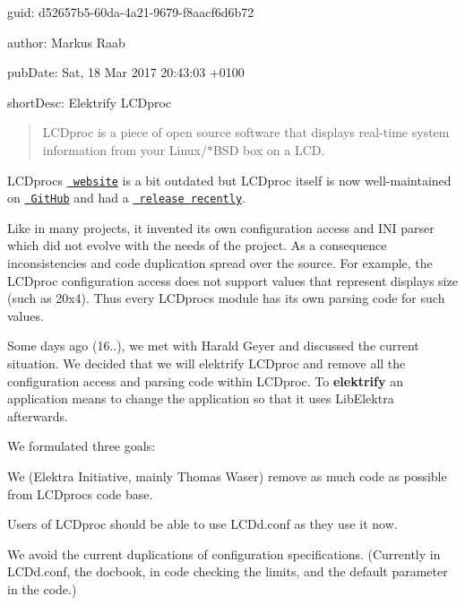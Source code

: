 
\begin{DoxyItemize}
\item guid\+: d52657b5-\/60da-\/4a21-\/9679-\/f8aacf6d6b72
\item author\+: Markus Raab
\item pub\+Date\+: Sat, 18 Mar 2017 20\+:43\+:03 +0100
\item short\+Desc\+: Elektrify L\+C\+Dproc
\end{DoxyItemize}

\begin{quote}
L\+C\+Dproc is a piece of open source software that displays real-\/time system information from your {\ttfamily Linux}/{\ttfamily $\ast$\+B\+SD} box on a L\+CD. \end{quote}


L\+C\+Dproc\textquotesingle{}s \href{http://lcdproc.omnipotent.net/}{\texttt{ website}} is a bit outdated but L\+C\+Dproc itself is now well-\/maintained on \href{https://github.com/lcdproc/lcdproc}{\texttt{ Git\+Hub}} and had a \href{https://github.com/lcdproc/lcdproc/releases}{\texttt{ release recently}}.

Like in many projects, it invented its own configuration access and I\+NI parser which did not evolve with the needs of the project. As a consequence inconsistencies and code duplication spread over the source. For example, the L\+C\+Dproc configuration access does not support values that represent display\textquotesingle{}s size (such as {\ttfamily 20x4}). Thus every L\+C\+Dproc\textquotesingle{}s module has its own parsing code for such values.

Some days ago (16..), we met with Harald Geyer and discussed the current situation. We decided that we will elektrify L\+C\+Dproc and remove all the configuration access and parsing code within L\+C\+Dproc. To {\bfseries{elektrify}} an application means to change the application so that it uses Lib\+Elektra afterwards.

We formulated three goals\+:


\begin{DoxyEnumerate}
\item We (Elektra Initiative, mainly Thomas Waser) remove as much code as possible from L\+C\+Dproc\textquotesingle{}s code base.
\item Users of L\+C\+Dproc should be able to use {\ttfamily L\+C\+Dd.\+conf} as they use it now.
\item We avoid the current duplications of configuration specifications. (Currently in {\ttfamily L\+C\+Dd.\+conf}, the docbook, in code checking the limits, and the default parameter in the code.)
\end{DoxyEnumerate}

